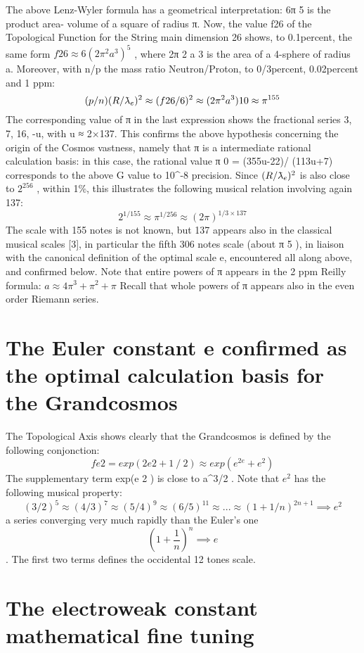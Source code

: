 The above Lenz-Wyler formula has a geometrical interpretation: 6π 5 is the product area-
volume of a square of radius π. Now, the value f{26} of the Topological Function for the String
main dimension 26 shows, to 0.1{percent}, the same form $f{26} \approx 6(2\pi^{2} a^{3} )^{5}$ , where 2π 2 a 3 is the area of a
4-sphere of radius a. Moreover, with n/p the mass ratio Neutron/Proton, to 0/3{percent}, 0.02{percent} and 1
ppm:
$$(p/n) (R/\lambdabar_e )^{2} \approx (f{26}/6)^{2} \approx (2\pi^{2} a^{3} ) 10 \approx \pi^{155}$$
The corresponding value of π in the last expression shows the fractional series 3, 7, 16, -u, with u ≈
2×137. This confirms the above hypothesis concerning the origin of the Cosmos vastness, namely
that π is a intermediate rational calculation basis: in this case, the rational value π 0 = (355u-22)/
(113u+7) corresponds to the above G value to 10^{-8} precision.
Since $(R/\lambdabar_e )^{2}$ is also close to $2^{256}$ , within 1\%, this illustrates the following musical relation
involving again 137:
$$2^{1/155} \approx \pi^{1/256} \approx (2\pi)^{1/3 \times 137}$$
The scale with 155 notes is not known, but 137 appears also in the classical musical scales [3], in
particular the fifth 306 notes scale (about π 5 ), in liaison with the canonical definition of the optimal
scale e, encountered all along above, and confirmed below.
Note that entire powers of π appears in the 2 ppm Reilly formula: $a \approx 4\pi^{3} + \pi^{2} + \pi$
Recall that whole powers of π appears also in the even order Riemann series.

\section {The Euler constant e confirmed as the optimal calculation basis for the Grandcosmos}

The Topological Axis shows clearly that the Grandcosmos is defined by the following
conjonction:
$$f{e 2 } = exp(2 e2 + 1⁄2 ) \approx exp(e^{2e} + e^{2} )$$
The supplementary term exp(e 2 ) is close to a^{3/2} . Note that $e^{2}$ has the following musical property:
$$(3/2)^{5} \approx (4/3)^{7} \approx (5/4)^{9} \approx (6/5)^{11} \approx ... \approx (1+1/n)^{2n+1} \implies e^{2}$$
a series converging very much rapidly than the Euler's one $$(1+\frac{1}{n})^{n} \implies e$$. The first two terms defines
the occidental 12 tones scale.

\section {The electroweak constant mathematical fine tuning}

